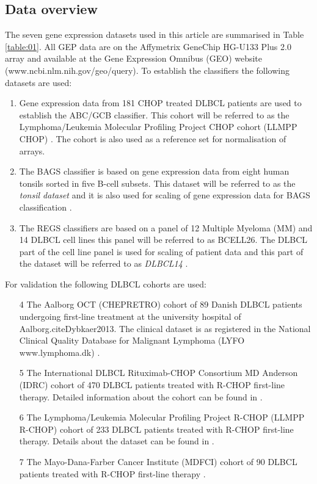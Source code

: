 \documentclass[10pt]{bmc_article}
\newenvironment{bmcformat}{\fussy\setboolean{publ}{true}}{\fussy}
\begin{document}
\begin{bmcformat}
\subsection*{Data overview}
The seven gene expression datasets used in this article are summarised in Table \ref{table:01}. All GEP data are on the Affymetrix GeneChip HG-U133 Plus 2.0 array and available at the Gene Expression Omnibus (GEO) website (www.ncbi.nlm.nih.gov/geo/query). To establish the classifiers the following datasets are used:
\begin{enumerate}
\item Gene expression data from 181 CHOP treated DLBCL patients are used to establish the ABC/GCB classifier. This cohort will be referred to as the Lymphoma/Leukemia Molecular Profiling Project CHOP cohort (LLMPP CHOP) \cite{Lenz2008a}. The cohort is also used as a reference set for normalisation of arrays.
\item The BAGS classifier is based on gene expression data from eight human tonsils sorted in five B-cell subsets. This dataset will be referred to as the \textit{tonsil dataset} and it is also used for scaling of gene expression data for BAGS classification \cite{Dybkaer2013}.
\item The REGS classifiers are based on a panel of 12 Multiple Myeloma (MM) and 14 DLBCL cell lines this panel will be referred to as BCELL26. The DLBCL part of the cell line panel is used for scaling of patient data and this part of the dataset will be referred to as \textit{DLBCL14} \cite{Falgreen2013c}.
\end{enumerate}
For validation the following DLBCL cohorts are used:
\begin{enumerate}
\item[4] The Aalborg OCT (CHEPRETRO) cohort of 89 Danish DLBCL patients undergoing first-line treatment at the university hospital of Aalborg.cite{Dybkaer2013}. The clinical dataset is as registered in the National Clinical Quality Database for Malignant Lymphoma (LYFO www.lymphoma.dk) \cite{Gang2012}.
\item[5] The International DLBCL Rituximab-CHOP Consortium MD Anderson (IDRC) cohort of 470 DLBCL patients treated with R-CHOP first-line therapy. Detailed information about the cohort can be found in \cite{Visco2012}.
\item[6] The Lymphoma/Leukemia Molecular Profiling Project R-CHOP (LLMPP R-CHOP) cohort of 233 DLBCL patients treated with R-CHOP first-line therapy. Details about the dataset can be found in \cite{Lenz2008a}.
\item[7] The Mayo-Dana-Farber Cancer Institute (MDFCI) cohort of 90 DLBCL patients treated with R-CHOP first-line therapy \cite{Monti2012a}.
\end{enumerate}



\end{bmcformat}
\end{document}
